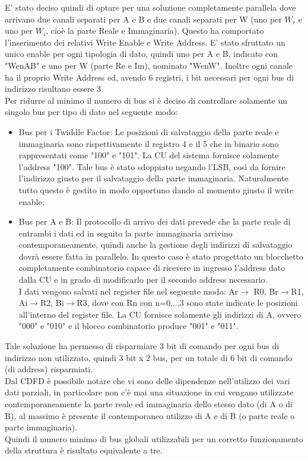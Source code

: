 \documentclass[a4paper, titlepage]{article}
\begin{document}
E' stato deciso quindi di optare per una soluzione completamente parallela dove arrivano due canali separati per A e B e due canali separati per W (uno per $W_{r}$ e uno per $W_{i}$, cioè la parte Reale e Immaginaria). Questo ha comportato l'inserimento dei relativi Write Enable e Write Address. E' stato sfruttato un unico enable per ogni tipologia di dato, quindi uno per A e B, indicato con "W\textunderscore enAB" e uno per W (parte Re e Im), nominato "W\textunderscore enW". Inoltre ogni canale ha il proprio Write Address ed, avendo 6 registri, i bit necessari per ogni bus di indirizzo risultano essere 3. \\Per ridurre al minimo il numero di bus si è deciso di controllare solamente un singolo bus per tipo di dato nel seguente modo:
\begin{itemize}
    \item Bus per i Twiddle Factor: Le posizioni di salvataggio della parte reale e immaginaria sono rispettivamente il registro 4 e il 5 che in binario sono rappresentati come "100" e "101". La CU del sistema fornisce solamente l'address "100". Tale bus è stato sdoppiato negando l'LSB, così da fornire l'indirizzo giusto per il salvataggio della parte immaginaria. Naturalmente tutto questo è gestito in modo opportuno dando al momento giusto il write enable;
    \item Bus per A e B: Il protocollo di arrivo dei dati prevede che la parte reale di entrambi i dati ed in seguito la parte immaginaria arrivino contemporaneamente, quindi anche la gestione degli indirizzi di salvataggio dovrà essere fatta in parallelo. In questo caso è stato progettato un blocchetto completamente combinatorio capace di ricevere in ingresso l'address dato dalla CU e in grado di modificarlo per il secondo address necessario.\\I dati vengono salvati nel register file nel seguente modo: Ar$\xrightarrow{}$ R0, Br$\xrightarrow{}$R1, Ai$\xrightarrow{}$R2, Bi$\xrightarrow{}$R3, dove con Rn con n=0,..,3 sono state indicate le posizioni all'interno del register file. La CU fornisce solamente gli indirizzi di A, ovvero "000" e "010" e il blocco combinatorio produce "001" e "011".
\end{itemize}
Tale soluzione ha permesso di risparmiare 3 bit di comando per ogni bus di indirizzo non utilizzato, quindi 3 bit x 2 bus, per un totale di 6 bit di comando (di address) risparmiati.\\
Dal CDFD è possibile notare che vi sono delle dipendenze nell'utilizzo dei vari dati parziali, in particolare non c'è mai una situazione in cui vengano utilizzate contemporaneamente la parte reale ed immaginaria dello stesso dato (di A o di B), al massimo è presente il contemporaneo utilizzo di A e di B (o parte reale o parte immaginaria).\\ Quindi il numero minimo di bus globali utilizzabili per un corretto funzionamento della struttura è risultato equivalente a tre.
\end{document}
